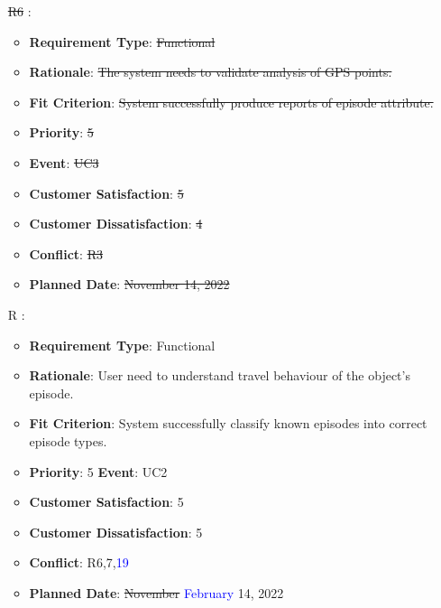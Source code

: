\documentclass[12pt, titlepage]{article}
\newcounter{reqnum} %
\begin{document}
\begin{itemize}
\item[\sout{R6}
\label{R_Inputs_1}:] 
\begin{itemize}
    \item \textbf{Requirement Type}: \sout{Functional}
    \item \textbf{Rationale}: \sout{The system needs to validate  analysis of GPS points.}
    \item \textbf{Fit Criterion}: \sout{System successfully produce reports of episode attribute.}
    \item \textbf{Priority}: \sout{5}
    \item \textbf{Event}: \sout{UC3}
    \item \textbf{Customer Satisfaction}: \sout{5}
    \item \textbf{Customer Dissatisfaction}: \sout{4}
    \item \textbf{Conflict}: \sout{R3}
    \item \textbf{Planned Date}: \sout{November 14, 2022}
\end{itemize}

\item[R\refstepcounter{reqnum}\thereqnum
\label{R_Inputs_1}:] 
\begin{itemize}
    \item \textbf{Requirement Type}: Functional
    \item \textbf{Rationale}: User need to understand travel behaviour of the object's episode.
    \item \textbf{Fit Criterion}: System successfully classify known episodes into correct episode types. 
    \item \textbf{Priority}: 5
    \textbf{Event}: UC2
    \item \textbf{Customer Satisfaction}: 5
    \item \textbf{Customer Dissatisfaction}: 5
    \item \textbf{Conflict}: R6,7,\textcolor{blue}{19}
    \item \textbf{Planned Date}: \sout{November} \textcolor{blue}{February} 14, 2022
\end{itemize}


\end{itemize}
\end{document}
